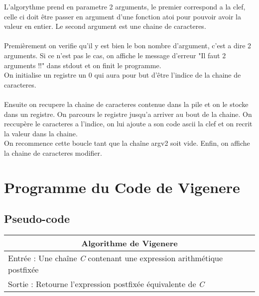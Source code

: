 \documentclass[a4paper, 12pt]{article}
\begin{document}
L'algorythme prend en parametre 2 arguments, le premier correspond a la clef, celle ci doit être passer en argument d'une fonction atoi pour pouvoir avoir la valeur en entier.
Le second argument est une chaine de caracteres.
\\
\\
Premièrement on verifie qu'il y est bien le bon nombre d'argument, c'est a dire 2 arguments. Si ce n'est pas le cas, on affiche le message d'erreur "Il faut 2 arguments !!" dans stdout et on finit le programme.
\\
On initialise un registre un 0 qui aura pour but d'être l'indice de la chaine de caracteres.
\\
\\
Ensuite on recupere la chaine de caracteres contenue dans la pile et on le stocke dans un registre. On parcours le registre jusqu'a arriver au bout de la chaine. On reccupère le caracteres a l'indice, on lui ajoute a son code ascii la clef et on recrit la valeur dans la chaine.
\\
On recommence cette boucle tant que la chaîne argv2 soit vide.
Enfin, on affiche la chaine de caracteres modifier.
\\

\newpage

\section{Programme du Code de Vigenere}


\subsection{Pseudo-code}

\begin{center}
  \begin{tabularx}{\textwidth}{|X|}
    \hline
    \multicolumn{1}{|c|}{ Algorithme de Vigenere } \\
    \hline
    Entrée : Une chaîne \textit{C} contenant une expression arithmétique postfixée  \\
    \hline
    Sortie : Retourne l'expression postfixée équivalente de \textit{C}  \\
    \hline
  \end{tabularx}
\end{center}
\end{document}
